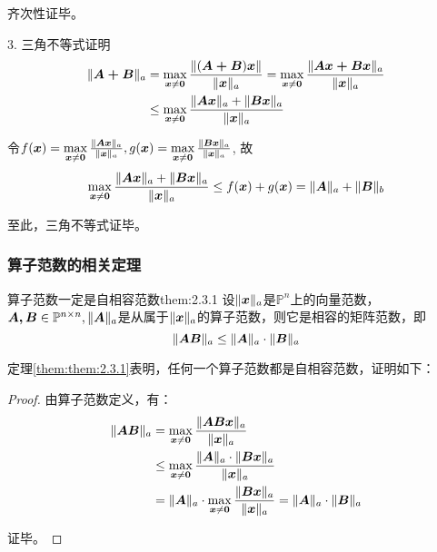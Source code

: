 \documentclass[12pt, a4paper, oneside, UTF8]{ctexbook}
\begin{document}
齐次性证毕。

3. 三角不等式证明
\[
\begin{aligned}
    \Vert\boldsymbol{A+B}\Vert_a&=\max\limits_{\boldsymbol{x}\neq\boldsymbol{0}}\frac{\Vert(\boldsymbol{A+B})\boldsymbol{x}\Vert}{\Vert\boldsymbol{x}\Vert_a}=\max\limits_{\boldsymbol{x}\neq\boldsymbol{0}}\frac{\Vert\boldsymbol{Ax+Bx}\Vert_a}{\Vert\boldsymbol{x}\Vert_a}\\
    &\leq \max\limits_{\boldsymbol{x}\neq \boldsymbol{0}}\frac{\Vert\boldsymbol{Ax}\Vert_a+\Vert\boldsymbol{Bx}\Vert_a}{\Vert\boldsymbol{x}\Vert_a}
\end{aligned}
\]

令$f(\boldsymbol{x})=\max\limits_{\boldsymbol{x}\neq \boldsymbol{0}}\frac{\Vert\boldsymbol{Ax}\Vert_a}{\Vert\boldsymbol{x}\Vert_a}, g(\boldsymbol{x})=\max\limits_{\boldsymbol{x}\neq \boldsymbol{0}}\frac{\Vert\boldsymbol{Bx}\Vert_a}{\Vert\boldsymbol{x}\Vert_a}$, 故
\[\begin{aligned}
    \max\limits_{\boldsymbol{x}\neq \boldsymbol{0}}\frac{\Vert\boldsymbol{Ax}\Vert_a+\Vert\boldsymbol{Bx}\Vert_a}{\Vert\boldsymbol{x}\Vert_a}\leq f(\boldsymbol{x})+g(\boldsymbol{x})=\Vert\boldsymbol{A}\Vert_a + \Vert\boldsymbol{B}\Vert_b
\end{aligned}
\]

至此，三角不等式证毕。

\subsubsection{算子范数的相关定理}

\begin{them}{算子范数一定是自相容范数}{them:2.3.1}
    设$\Vert\boldsymbol{x}\Vert_a$是$\mathbb{P}^{n}$上的向量范数，$\boldsymbol{A,B}\in\mathbb{P}^{n\times n},\Vert\boldsymbol{A}\Vert_a$是从属于$\Vert\boldsymbol{x}\Vert_a$的算子范数，则它是相容的矩阵范数，即\[\Vert\boldsymbol{AB}\Vert_a\leq\Vert\boldsymbol{A}\Vert_a\cdot\Vert\boldsymbol{B}\Vert_a\]
\end{them}

定理\ref{them:them:2.3.1}表明，任何一个算子范数都是自相容范数，证明如下：

\begin{proof}
    由算子范数定义，有：
    \[\begin{aligned}
    \Vert\boldsymbol{AB}\Vert_a&=\max\limits_{\boldsymbol{x}\neq \boldsymbol{0}}\frac{\Vert\boldsymbol{ABx}\Vert_a}{\Vert\boldsymbol{x}\Vert_a}\\
    &\leq \max\limits_{\boldsymbol{x}\neq \boldsymbol{0}}\frac{\Vert\boldsymbol{A}\Vert_a\cdot\Vert\boldsymbol{Bx}\Vert_a}{\Vert\boldsymbol{x}\Vert_a}\\
    &=\Vert\boldsymbol{A}\Vert_a\cdot\max\limits_{\boldsymbol{x}\neq \boldsymbol{0}}\frac{\Vert\boldsymbol{Bx}\Vert_a}{\Vert\boldsymbol{x}\Vert_a}=\Vert\boldsymbol{A}\Vert_a\cdot\Vert\boldsymbol{B}\Vert_a
\end{aligned}
\]

证毕。
\end{proof}
\end{document}
